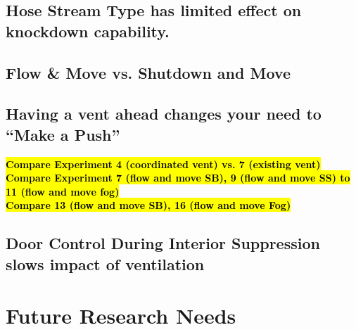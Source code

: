 \documentclass[12pt,oneside]{book}
\begin{document}
\section{Hose Stream Type has limited effect on knockdown capability.}

\section{Flow \& Move vs. Shutdown and Move}

\section{Having a vent ahead changes your need to ``Make a Push''}

	\bf{\hl{Compare Experiment 4 (coordinated vent) vs. 7 (existing vent)}} \\
	
	\bf{\hl{Compare Experiment 7 (flow and move SB), 9 (flow and move SS) to 11 (flow and move fog)}} \\
	
	\bf{\hl{Compare 13 (flow and move SB), 16 (flow and move Fog)}} \\

\section{Door Control During Interior Suppression slows impact of ventilation}


\chapter{Future Research Needs}






\clearpage
\end{document}

